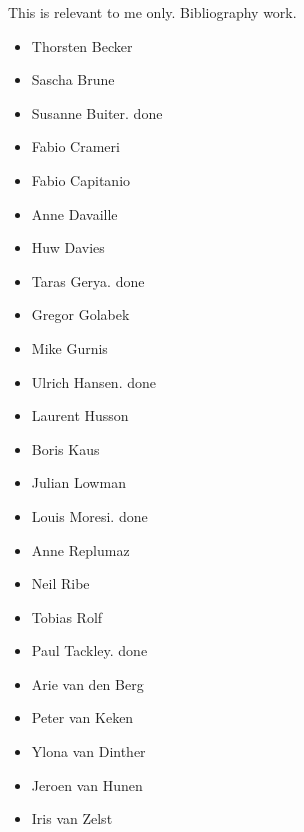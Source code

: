 
This is relevant to me only. Bibliography work.
\begin{itemize}
\item Thorsten Becker
\item Sascha Brune
\item Susanne Buiter. done
\item Fabio Crameri
\item Fabio Capitanio
\item Anne Davaille
\item Huw Davies
\item Taras Gerya. done
\item Gregor Golabek
\item Mike Gurnis
\item Ulrich Hansen. done
\item Laurent Husson
\item Boris Kaus 
\item Julian Lowman
\item Louis Moresi. done
\item Anne Replumaz
\item Neil Ribe
\item Tobias Rolf
\item Paul Tackley. done
\item Arie van den Berg
\item Peter van Keken 
\item Ylona van Dinther
\item Jeroen van Hunen
\item Iris van Zelst
\end{itemize}
